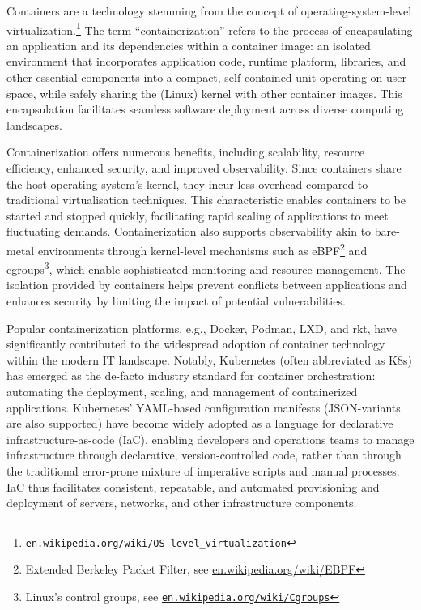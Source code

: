 \documentclass{easychair}
\begin{document}
Containers are a technology stemming from the concept of operating-system-level 
virtualization.\footnote{%
\href{https://en.wikipedia.org/wiki/OS-level_virtualization}{\tt en.wikipedia.org/wiki/OS-level\_virtualization}} 
The term ``containerization'' refers to the process of encapsulating an application and its 
dependencies within a container image: an isolated environment that incorporates application code, 
runtime platform, libraries, and other essential components into a compact, self-contained unit 
operating on user space, while safely sharing the (Linux) kernel with other container images. 
This encapsulation facilitates seamless software deployment across diverse computing landscapes.

Containerization offers numerous benefits, including scalability, resource efficiency, enhanced 
security, and improved observability. 
Since containers share the host operating system's kernel, they incur less overhead compared to 
traditional virtualisation techniques. 
This characteristic enables containers to be started and stopped quickly, facilitating rapid 
scaling of applications to meet fluctuating demands. 
Containerization also supports observability akin to bare-metal environments through kernel-level 
mechanisms such as eBPF\footnote{%
Extended Berkeley Packet Filter, see \href{https://en.wikipedia.org/wiki/EBPF}{en.wikipedia.org/wiki/EBPF}}
and cgroups\footnote{%
Linux's control groups, see \href{https://en.wikipedia.org/wiki/Cgroups}{\tt en.wikipedia.org/wiki/Cgroups}}, 
which enable sophisticated monitoring and resource management. 
The isolation provided by containers helps prevent conflicts between applications and enhances 
security by limiting the impact of potential vulnerabilities.

Popular containerization platforms, e.g., Docker, Podman, LXD, and rkt, have significantly 
contributed to the widespread adoption of container technology within the modern IT landscape. 
Notably, Kubernetes (often abbreviated as K8s) has emerged as the de-facto industry standard for 
container orchestration: automating the deployment, scaling, and management of containerized 
applications. 
Kubernetes' YAML-based configuration manifests (JSON-variants are also supported) have become 
widely adopted as a language for  declarative infrastructure-as-code (IaC), enabling developers 
and operations teams to manage infrastructure through declarative, version-controlled code, 
rather than through the traditional error-prone mixture of imperative scripts and manual processes. 
IaC thus facilitates consistent, repeatable, and automated provisioning and deployment of servers, 
networks, and other infrastructure components.
\end{document}
